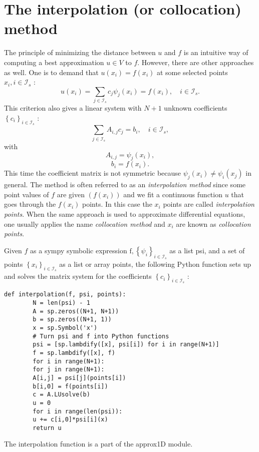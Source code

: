 \documentclass[../main.tex]{subfiles}
\begin{document}
	\section[The interpolation (or collocation) method]{The interpolation (or collocation) method}
	\label{sec:sec_2_10}
	The principle of minimizing the distance between $u$ and $f$ is an intuitive way of computing a best approximation $u \in V$ to $f$. However, there are other approaches as well. One is to demand that $u\left(x_{i}\right)=f\left(x_{i}\right)$ at some selected points $x_{i}, i \in \mathcal{I}_{s}$ :
	\begin{equation}\label{eqa42}
		u\left(x_{i}\right)=\sum_{j \in \mathcal{I}_{s}} c_{j} \psi_{j}\left(x_{i}\right)=f\left(x_{i}\right), \quad i \in \mathcal{I}_{s}.
	\end{equation}
	This criterion also gives a linear system with $N+1$ unknown coefficients
	$\left\{c_{i}\right\}_{i \in \mathcal{I}_{s}}$ :
	\begin{equation}\label{eqa43}
		\sum_{j \in \mathcal{I}_{s}} A_{i, j} c_{j}=b_{i}, \quad i \in \mathcal{I}_{s},
	\end{equation}
	with
	\begin{equation}\label{eqa44}
		A_{i, j} = \psi_{j}\left(x_{i}\right),
	\end{equation}
	\begin{equation}\label{eqa45}
		b_{i} = f\left(x_{i}\right).
	\end{equation}
	This time the coefficient matrix is not symmetric because $\psi_{j}\left(x_{i}\right) \neq \psi_{i}\left(x_{j}\right)$ in general. The method is often referred to as an \textit{interpolation method} since some point values of $f$ are given $\left(f\left(x_{i}\right)\right)$ and we fit a continuous function $u$ that goes through the $f\left(x_{i}\right)$ points. In this case the $x_{i}$ points are called \textit{interpolation points}. When the same approach is used to approximate differential equations, one usually applies the name \textit{collocation method} and $x_{i}$ are known as \textit{collocation points}.
	
	Given $f$ as a sympy symbolic expression $\mathrm{f},\left\{\psi_{i}\right\}_{i \in \mathcal{I}_{s}}$ as a list psi, and a set of points $\left\{x_{i}\right\}_{i \in \mathcal{I}_{s}}$ as a list or array points, the following Python function sets up and solves the matrix system for the coefficients $\left\{c_{i}\right\}_{i \in \mathcal{I}_{s}}$ :
	\begin{lstlisting}[numbers=none]
		def interpolation(f, psi, points):
		N = len(psi) - 1
		A = sp.zeros((N+1, N+1))
		b = sp.zeros((N+1, 1))
		x = sp.Symbol('x')
		# Turn psi and f into Python functions
		psi = [sp.lambdify([x], psi[i]) for i in range(N+1)]
		f = sp.lambdify([x], f)
		for i in range(N+1):
		for j in range(N+1):
		A[i,j] = psi[j](points[i])
		b[i,0] = f(points[i])
		c = A.LUsolve(b)
		u = 0
		for i in range(len(psi)):
		u += c[i,0]*psi[i](x)
		return u	
	\end{lstlisting}	
	The interpolation function is a part of the approx1D module.
	
\end{document}
